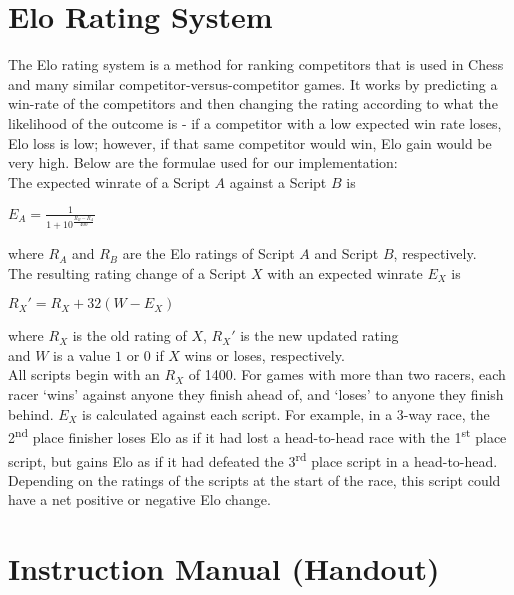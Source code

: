 \section{Elo Rating System}
\label{Elo}
The Elo rating system is a method for ranking competitors that is used in Chess and many similar competitor-versus-competitor games. It works by predicting a win-rate of the competitors and then changing the rating according to what the likelihood of the outcome is - if a competitor with a low expected win rate loses, Elo loss is low; however, if that same competitor would win, Elo gain would be very high. Below are the formulae used for our implementation:\\

\noindent The expected winrate of a Script $A$ against a Script $B$ is \\

{\Large\centerline{$E_{A} = \frac{1}{1 + 10^\frac{R_{B}-R_{A}}{400}}$}} \vspace{2mm}

\hspace*{5mm} where $R_{A}$ and $R_{B}$ are the Elo ratings of Script $A$ and Script $B$, respectively.\\

\noindent The resulting rating change of a Script $X$ with an expected winrate $E_{X}$ is \\

{\Large\centerline{$R_{X}' = R_{X} + 32(W - E_{X})$}} \vspace{2mm}

\hspace*{5mm} where $R_{X}$ is the old rating of $X$, $R_{X}'$ is the new updated rating \\
\hspace*{17mm} and $W$ is a value $1$ or $0$ if $X$ wins or loses, respectively.\\

All scripts begin with an $R_{X}$ of 1400.  For games with more than two racers, each racer `wins' against anyone they finish ahead of, and `loses' to anyone they finish behind. $E_{X}$ is calculated against each script. For example, in a 3-way race, the 2\textsuperscript{nd} place finisher loses Elo as if it had lost a head-to-head race with the 1\textsuperscript{st} place script, but gains Elo as if it had defeated the 3\textsuperscript{rd} place script in a head-to-head. Depending on the ratings of the scripts at the start of the race, this script could have a net positive or negative Elo change.
\section{Instruction Manual (Handout)}

